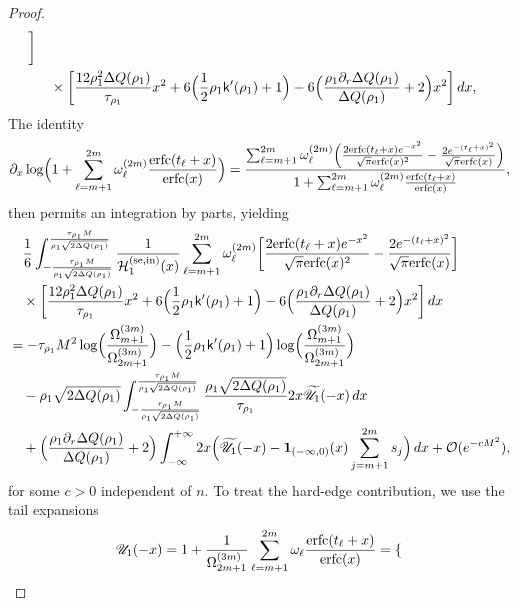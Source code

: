 \documentclass[a4paper]{article}
\newcommand{\erfc}{{\rm erfc}}
\numberwithin{equation}{section}
\begin{document}
\begin{proof}
\begin{align*}
\bigg]
\\
&\quad \times
\bigg[
\frac{12\rho_1^2\Delta Q(\rho_1)}{\tau_{\rho_1}}x^2+6\Bigl(\frac{1}{2}\rho_1\mathsf{k}'(\rho_1)+1\Bigr)-6\Bigl(\frac{\rho_1\partial_r\Delta Q(\rho_1)}{\Delta Q(\rho_1)}+2\Bigr)x^2
\bigg]
\,dx,
\end{align*}
The identity
\begin{align*}
\partial_x\log\Bigl( 
1+\sum_{\ell=m+1}^{2m}\omega_{\ell}^{(2m)}
\frac{\erfc(t_{\ell}+x)}{\erfc(x)}
\Bigr)
=
\frac{\sum_{\ell=m+1}^{2m}\omega_{\ell}^{(2m)}\Bigl( 
\frac{2\erfc(t_{\ell}+x)e^{-x^2}}{\sqrt{\pi}\erfc(x)^2}
-
\frac{2e^{-(t_{\ell}+x)^2}}{\sqrt{\pi}\erfc(x)}
\Bigr)}{1+\sum_{\ell=m+1}^{2m}\omega_{\ell}^{(2m)}
\frac{\erfc(t_{\ell}+x)}{\erfc(x)}},
\end{align*}
then permits an integration by parts, yielding
\begin{align*}
&\quad 
\frac{1}{6}
\int_{-\frac{\tau_{\rho_1}M}{\rho_1\sqrt{2\Delta Q(\rho_1)}}}^{\frac{\tau_{\rho_1}M}{\rho_1\sqrt{2\Delta Q(\rho_1)}}}
\frac{1}{\mathcal{H}_1^{(\mathrm{se},\mathrm{in})}(x)}
\sum_{\ell=m+1}^{2m}
\omega_{\ell}^{(2m)}
\bigg[
\frac{2\erfc(t_{\ell}+x)e^{-x^2}}{\sqrt{\pi}\erfc(x)^2}-\frac{2e^{-(t_{\ell}+x)^2}}{\sqrt{\pi}\erfc(x)}
\bigg]
\\
&\quad \times
\bigg[
\frac{12\rho_1^2\Delta Q(\rho_1)}{\tau_{\rho_1}}x^2+6\Bigl(\frac{1}{2}\rho_1\mathsf{k}'(\rho_1)+1\Bigr)-6\Bigl(\frac{\rho_1\partial_r\Delta Q(\rho_1)}{\Delta Q(\rho_1)}+2\Bigr)x^2
\bigg]
\,dx
\\
&
=
-\tau_{\rho_1}M^2\log\Bigl(\frac{\Omega_{m+1}^{(3m)}}{\Omega_{2m+1}^{(3m)}}\Bigr)
-\Bigl(\frac{1}{2}\rho_1\mathsf{k}'(\rho_1)+1\Bigr)\log\Bigl(\frac{\Omega_{m+1}^{(3m)}}{\Omega_{2m+1}^{(3m)}}\Bigr)
\\
&\quad 
-
\rho_1\sqrt{2\Delta Q(\rho_1)}
\int_{-\frac{\tau_{\rho_1}M}{\rho_1\sqrt{2\Delta Q(\rho_1)}}}^{\frac{\tau_{\rho_1}M}{\rho_1\sqrt{2\Delta Q(\rho_1)}}}
\frac{\rho_1\sqrt{2\Delta Q(\rho_1)}}{\tau_{\rho_1}}
2x\widetilde{\mathscr{U}}_1(-x)
\,dx
\\
&\quad 
+
\Bigl(\frac{\rho_1\partial_r\Delta Q(\rho_1)}{\Delta Q(\rho_1)}+2\Bigr)
\int_{-\infty}^{+\infty}
2x\Bigl(\widetilde{\mathscr{U}}_1(-x)-\mathbf{1}_{(-\infty,0)}(x)\sum_{j=m+1}^{2m}s_j\Bigr)
\,dx
+\mathcal{O}(e^{-cM^2}),
\end{align*}
for some $c>0$ independent of $n$.  To treat the hard-edge contribution, we
use the tail expansions
\[
\mathscr{U}_{1}(-x)=  
1+\frac{1}{\Omega_{2m+1}^{(3m)}}\sum_{\ell=m+1}^{2m}\omega_{\ell}\frac{\erfc(t_{\ell}+x)}{\erfc(x)}
=
\begin{cases}

\end{cases}\]
\end{proof}
\end{document}
